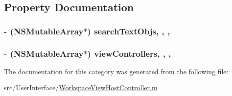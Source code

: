 \subsection{Property Documentation}
\hypertarget{category_workspace_view_host_controller_07_08_a83d5760a6f006dd513ac27edcec6b68c}{
\subsubsection[{search\-Text\-Objs}]{\setlength{\rightskip}{0pt plus 5cm}-\/ (N\-S\-Mutable\-Array$\ast$) search\-Text\-Objs\hspace{0.3cm}{\ttfamily [read]}, {\ttfamily [write]}, {\ttfamily [atomic]}, {\ttfamily [retain]}}}\label{category_workspace_view_host_controller_07_08_a83d5760a6f006dd513ac27edcec6b68c}
\hypertarget{category_workspace_view_host_controller_07_08_a588ec80eb0221384c948a3ff05bd9372}{
\subsubsection[{view\-Controllers}]{\setlength{\rightskip}{0pt plus 5cm}-\/ (N\-S\-Mutable\-Array$\ast$) view\-Controllers\hspace{0.3cm}{\ttfamily [read]}, {\ttfamily [write]}, {\ttfamily [atomic]}, {\ttfamily [retain]}}}\label{category_workspace_view_host_controller_07_08_a588ec80eb0221384c948a3ff05bd9372}


The documentation for this category was generated from the following file\-:\begin{DoxyCompactItemize}
\item 
src/\-User\-Interface/\hyperlink{_workspace_view_host_controller_8m}{Workspace\-View\-Host\-Controller.\-m}\end{DoxyCompactItemize}
